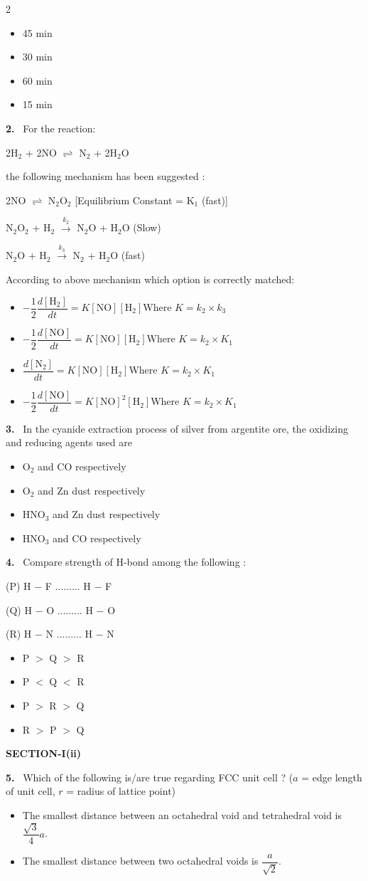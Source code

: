 \documentclass[10pt]{extarticle}
\newcommand{\sect}[1]{\par\smallskip\noindent\textbf{#1}\par}
\newcommand{\qn}[1]{\par\smallskip\noindent\textbf{#1.}~}
\newenvironment{qoptions}{\begin{itemize}[leftmargin=1.8em,itemsep=1pt,topsep=2pt,label={}]}{\end{itemize}}
\newcommand{\opt}[2]{\item[(#1)] #2}
\begin{document}
\begin{multicols}{2}
\begin{qoptions}
\opt{A}{45 min}
\opt{B}{30 min}
\opt{C}{60 min}
\opt{D}{15 min}
\end{qoptions}
\qn{2} For the reaction:\par
2H$_2$ + 2NO $\rightleftharpoons$ N$_2$ + 2H$_2$O\par
the following mechanism has been suggested :\par
2NO $\rightleftharpoons$ N$_2$O$_2$ [Equilibrium Constant = K$_1$ (fast)]\par
N$_2$O$_2$ + H$_2$ $\xrightarrow{k_2}$ N$_2$O + H$_2$O (Slow)\par
N$_2$O + H$_2$ $\xrightarrow{k_3}$ N$_2$ + H$_2$O (fast)\par
According to above mechanism which option is correctly matched:
\begin{qoptions}
\opt{A}{$-\dfrac12\dfrac{d[\mathrm{H_2}]}{dt}=K[\mathrm{NO}][\mathrm{H_2}]$\quad Where $K=k_2\times k_3$}
\opt{B}{$-\dfrac12\dfrac{d[\mathrm{NO}]}{dt}=K[\mathrm{NO}][\mathrm{H_2}]$\quad Where $K=k_2\times K_1$}
\opt{C}{$\dfrac{d[\mathrm{N_2}]}{dt}=K[\mathrm{NO}][\mathrm{H_2}]$\quad Where $K=k_2\times K_1$}
\opt{D}{$-\dfrac12\dfrac{d[\mathrm{NO}]}{dt}=K[\mathrm{NO}]^2[\mathrm{H_2}]$\quad Where $K=k_2\times K_1$}
\end{qoptions}
\qn{3} In the cyanide extraction process of silver from argentite ore, the oxidizing and reducing agents used are
\begin{qoptions}
\opt{A}{O$_2$ and CO respectively}
\opt{B}{O$_2$ and Zn dust respectively}
\opt{C}{HNO$_3$ and Zn dust respectively}
\opt{D}{HNO$_3$ and CO respectively}
\end{qoptions}
\qn{4} Compare strength of H-bond among the following :\par
(P) H $-$ F ......... H $-$ F\par
(Q) H $-$ O ......... H $-$ O\par
(R) H $-$ N ......... H $-$ N
\begin{qoptions}
\opt{A}{P $>$ Q $>$ R}
\opt{B}{P $<$ Q $<$ R}
\opt{C}{P $>$ R $>$ Q}
\opt{D}{R $>$ P $>$ Q}
\end{qoptions}
\sect{SECTION-I(ii)}
\qn{5} Which of the following is/are true regarding FCC unit cell ? ($a$ = edge length of unit cell, $r$ = radius of lattice point)
\begin{qoptions}
\opt{A}{The smallest distance between an octahedral void and tetrahedral void is $\dfrac{\sqrt3}{4}a$.}
\opt{B}{The smallest distance between two octahedral voids is $\dfrac{a}{\sqrt2}$.}

\end{qoptions}
\end{multicols}
\end{document}
